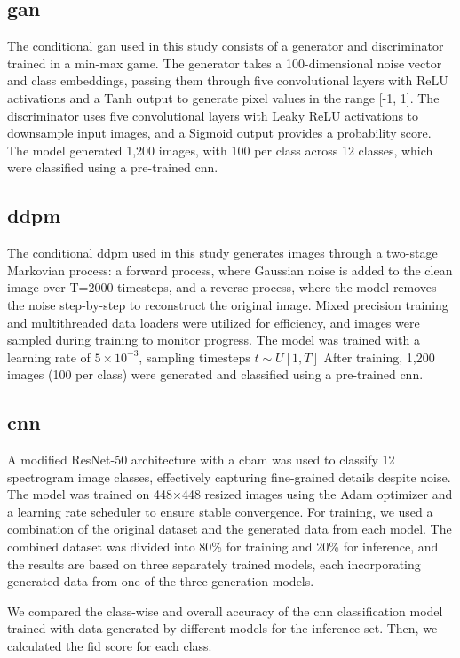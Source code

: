 \subsection{\gls{gan}}
The conditional \gls{gan} used in this study consists of a generator and discriminator trained in a min-max game. The generator takes a 100-dimensional noise vector and class embeddings, passing them through five convolutional layers with ReLU activations and a Tanh output to generate pixel values in the range [-1, 1]. The discriminator uses five convolutional layers with Leaky ReLU activations to downsample input images, and a Sigmoid output provides a probability score. The model generated 1,200 images, with 100 per class across 12 classes, which were classified using a pre-trained \gls{cnn}.

\subsection{\gls{ddpm}}
The conditional \gls{ddpm} used in this study generates images through a two-stage Markovian process: a forward process, where Gaussian noise is added to the clean image over T=2000 timesteps, and a reverse process, where the model removes the noise step-by-step to reconstruct the original image. Mixed precision training and multithreaded data loaders were utilized for efficiency, and images were sampled during training to monitor progress. The model was trained with a learning rate of $5\times10^{-3}$, sampling timesteps $t\sim U[1,T]$ After training, 1,200 images (100 per class) were generated and classified using a pre-trained \gls{cnn}.

\subsection{\gls{cnn}}
A modified ResNet-50 architecture with a \gls{cbam} was used to classify 12 spectrogram image classes, effectively capturing fine-grained details despite noise. The model was trained on 448×448 resized images using the Adam optimizer and a learning rate scheduler to ensure stable convergence. For training, we used a combination of the original dataset and the generated data from each model. The combined dataset was divided into 80\% for training and 20\% for inference, and the results are based on three separately trained models, each incorporating generated data from one of the three-generation models.

We compared the class-wise and overall accuracy of the \gls{cnn} classification model trained with data generated by different models for the inference set. Then, we calculated the \gls{fid} score for each class. 

